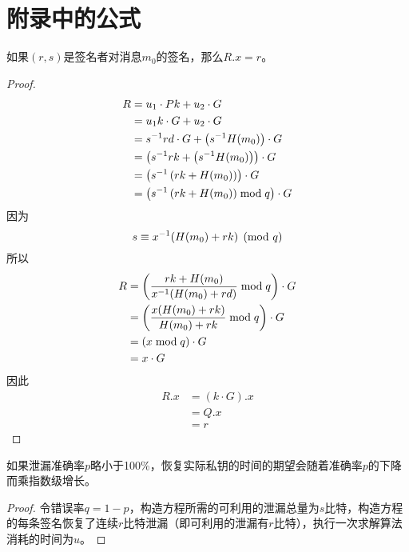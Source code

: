 \thispagestyle{appendixheader}
\setcounter{app_fig}{1}
\setcounter{app_tab}{1}
\setcounter{equation}{0}
\renewcommand\theequation{附\arabic{app}-\arabic{equation}}
\renewcommand\chaptername{附录}
\renewcommand\chaptername{Appendix} 
\renewcommand\thechapter{附录\zhnum{app}} 

\setcounter{chapter}{0}
\setcounter{section}{0}
\chapter{附录中的公式}\label{chap:app1}{
	\setcounter{app_fig}{1}
	\begin{proposition}\label{prop:ECDSA-authentication}
		如果$(r,s)$是签名者对消息$m_0$的签名，那么$R.x=r$。 
	\end{proposition}
	\begin{proof}
		\begin{align*}
			R&=u_1\cdot Pk+u_2\cdot G \\
			&= u_1k\cdot G+u_2\cdot G \\
			&= s^{-1}rd\cdot G+\left(s^{-1}H(m_0)\right)\cdot G \\
			&= \left(s^{-1}rk+\left(s^{-1}H(m_0)\right)\right)\cdot G \\
			&= \left(s^{-1}\left(rk+H(m_0)\right)\right)\cdot G \\
			&= \left(s^{-1}\left(rk+H(m_0)\right)\bmod q\right)\cdot G
		\end{align*}
		因为$$s\equiv x^{-1}(H(m_0)+rk) \pmod q$$
		所以\begin{align*}
			R&= \left(\frac{rk+H(m_0)}{x^{-1}(H(m_0)+rd)}\bmod q\right)\cdot G \\
			&= \left(\frac{x(H(m_0)+rk)}{H(m_0)+rk}\bmod q\right)\cdot G \\
			&= \left(x\bmod q\right)\cdot G \\
			&= x\cdot G
		\end{align*}
		因此\begin{align*}
			R.x&=\left(k\cdot G\right).x\\
			&=Q.x\\
			&=r
		\end{align*}
	\end{proof}
		
	\begin{proposition}\label{prop:expotime}
		如果泄漏准确率$p$略小于100\%，恢复实际私钥的时间的期望会随着准确率$p$的下降而乘指数级增长。
	\end{proposition}
	\begin{proof}
		令错误率$q=1-p$，构造方程所需的可利用的泄漏总量为$s$比特，构造方程的每条签名恢复了连续$r$比特泄漏（即可利用的泄漏有$r$比特），执行一次求解算法消耗的时间为$u$。
		

\end{proof}}
